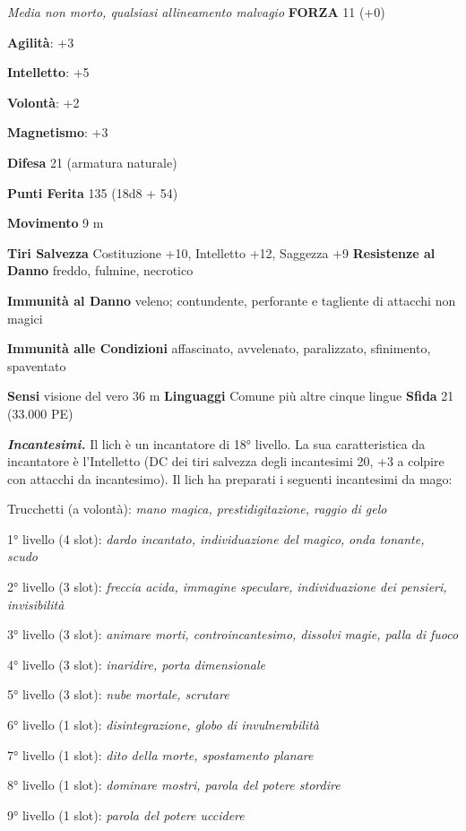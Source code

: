 \begin{multicols}{2}
\emph{Media non morto, qualsiasi allineamento malvagio} \textbf{FORZA}
11 (+0)

\textbf{Agilità}: +3

\textbf{Intelletto}: +5

\textbf{Volontà}: +2

\textbf{Magnetismo}: +3

\textbf{Difesa} 21 (armatura naturale)

\textbf{Punti Ferita} 135 (18d8 + 54)

\textbf{Movimento} 9 m

\textbf{Tiri Salvezza} Costituzione +10, Intelletto +12, Saggezza +9
\textbf{Resistenze al Danno} freddo, fulmine, necrotico

\textbf{Immunità al Danno} veleno; contundente, perforante e tagliente
di attacchi non magici

\textbf{Immunità alle Condizioni} affascinato, avvelenato, paralizzato,
sfinimento, spaventato

\textbf{Sensi} visione del vero 36 m
\textbf{Linguaggi} Comune più altre cinque lingue \textbf{Sfida} 21
(33.000 PE)

\emph{\textbf{Incantesimi.}} Il lich è un incantatore di 18° livello. La
sua caratteristica da incantatore è l'Intelletto (DC dei tiri salvezza
degli incantesimi 20, +3 a colpire con attacchi da incantesimo). Il lich
ha preparati i seguenti incantesimi da mago:

Trucchetti (a volontà): \emph{mano magica, prestidigitazione, raggio}
\emph{di gelo}

1° livello (4 slot): \emph{dardo incantato, individuazione del magico,}
\emph{onda tonante, scudo}

2° livello (3 slot): \emph{freccia acida, immagine speculare,}
\emph{individuazione dei pensieri, invisibilità}

3° livello (3 slot): \emph{animare morti, controincantesimo, dissolvi}
\emph{magie, palla di fuoco}

4° livello (3 slot): \emph{inaridire, porta dimensionale}

5° livello (3 slot): \emph{nube mortale, scrutare}

6° livello (1 slot): \emph{disintegrazione, globo di invulnerabilità}

7° livello (1 slot): \emph{dito della morte, spostamento planare}

8° livello (1 slot): \emph{dominare mostri, parola del potere stordire}

9° livello (1 slot): \emph{parola del potere uccidere}


\end{multicols}

